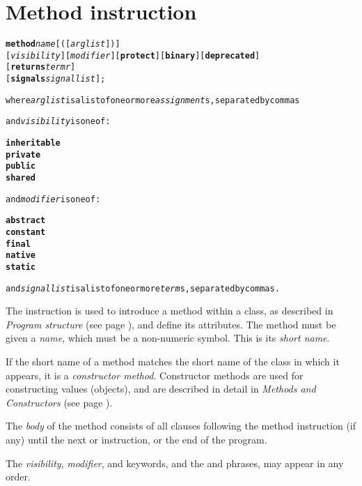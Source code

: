 \section{Method instruction}\label{refmethod}
\index{,}
\index{,}
\begin{shaded}
\begin{alltt}
\textbf{method} \emph{name}[([\emph{arglist}])]
               [\emph{visibility}] [\emph{modifier}] [\textbf{protect}] [\textbf{binary}] [\textbf{deprecated}]
               [\textbf{returns} \emph{termr}]
               [\textbf{signals} \emph{signallist}];

where \emph{arglist} is a list of one or more \emph{assignment}s, separated by commas

and \emph{visibility} is one of:

    \textbf{inheritable}
    \textbf{private}
    \textbf{public}
    \textbf{shared}

and \emph{modifier} is one of:

    \textbf{abstract}
    \textbf{constant}
    \textbf{final}
    \textbf{native}
    \textbf{static}

and \emph{signallist} is a list of one or more \emph{term}s, separated by commas.
\end{alltt}
\end{shaded}
 The  instruction is used to introduce a method within
a class, as described in  \emph{Program structure} (see page \pageref{refpstruct}), and define its attributes.
The method must be given a \emph{name}, which must be a non-numeric
symbol.
This is its \emph{short name}.
 
If the short name of a method matches the short name of the class in
which it appears, it is a \emph{constructor method}.
Constructor methods are used for constructing values (objects), and are
described in detail in  \emph{Methods and Constructors} (see page \pageref{refmethcon}).
 
The \emph{body} of the method consists of all clauses following the
method instruction (if any) until the next  or
 instruction, or the end of the program.
 
The \emph{visibility}, \emph{modifier}, and 
keywords, and the  and  phrases, may
appear in any order.
